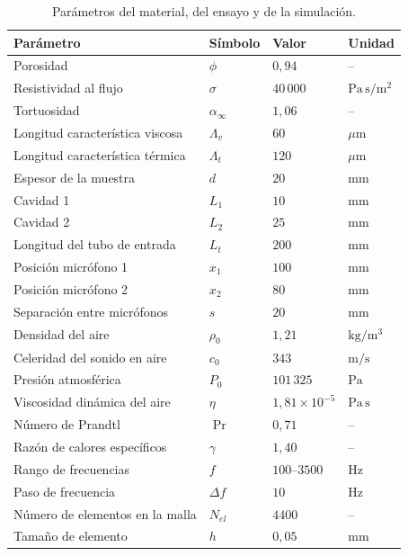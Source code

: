 \documentclass[11pt,a4paper]{article}
\begin{document}
\begin{table}[H]
\centering
\caption{Parámetros del material, del ensayo y de la simulación.}
\label{tab:params}
\begin{tabular}{@{}llll@{}}
\toprule
\textbf{Parámetro} & \textbf{Símbolo} & \textbf{Valor} & \textbf{Unidad} \\
\midrule
Porosidad & $\phi$ & $0{,}94$ & -- \\
Resistividad al flujo & $\sigma$ & $40\,000$ & $\mathrm{Pa\,s/m^2}$ \\
Tortuosidad & $\alpha_\infty$ & $1{,}06$ & -- \\
Longitud característica viscosa & $\Lambda_v$ & $60$ & $\mu\mathrm{m}$ \\
Longitud característica térmica & $\Lambda_t$ & $120$ & $\mu\mathrm{m}$ \\
Espesor de la muestra & $d$ & $20$ & $\mathrm{mm}$ \\
Cavidad 1 & $L_1$ & $10$ & $\mathrm{mm}$ \\
Cavidad 2 & $L_2$ & $25$ & $\mathrm{mm}$ \\
Longitud del tubo de entrada & $L_t$ & $200$ & $\mathrm{mm}$ \\
Posición micrófono 1 & $x_1$ & $100$ & $\mathrm{mm}$ \\
Posición micrófono 2 & $x_2$ & $80$ & $\mathrm{mm}$ \\
Separación entre micrófonos & $s$ & $20$ & $\mathrm{mm}$ \\
Densidad del aire & $\rho_0$ & $1{,}21$ & $\mathrm{kg/m^3}$ \\
Celeridad del sonido en aire & $c_0$ & $343$ & $\mathrm{m/s}$ \\
Presión atmosférica & $P_0$ & $101\,325$ & $\mathrm{Pa}$ \\
Viscosidad dinámica del aire & $\eta$ & $1{,}81\times 10^{-5}$ & $\mathrm{Pa\,s}$ \\
Número de Prandtl & $\operatorname{Pr}$ & $0{,}71$ & -- \\
Razón de calores específicos & $\gamma$ & $1{,}40$ & -- \\
Rango de frecuencias & $f$ & $100\text{--}3500$ & $\mathrm{Hz}$ \\
Paso de frecuencia & $\Delta f$ & $10$ & $\mathrm{Hz}$ \\
Número de elementos en la malla & $N_{el}$ & $4400$ & -- \\
Tamaño de elemento & $h$ & $0{,}05$ & $\mathrm{mm}$ \\
\bottomrule
\end{tabular}
\end{table}
\end{document}
